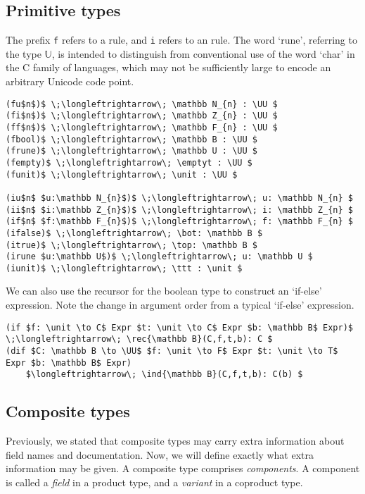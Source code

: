 \documentclass[11pt]{book}
\begin{document}
\subsection{Primitive types}
The prefix \lstinline{f} refers to a \rform{} rule, and \lstinline{i} refers to an \rintro{} rule.
The word `rune', referring to the type \( \mathbb U \), is intended to distinguish from conventional use of the word `char' in the C family of languages, which may not be sufficiently large to encode an arbitrary Unicode code point.
\begin{lstlisting}[mathescape=true]
(fu$n$)$ \;\longleftrightarrow\; \mathbb N_{n} : \UU $
(fi$n$)$ \;\longleftrightarrow\; \mathbb Z_{n} : \UU $
(ff$n$)$ \;\longleftrightarrow\; \mathbb F_{n} : \UU $
(fbool)$ \;\longleftrightarrow\; \mathbb B : \UU $
(frune)$ \;\longleftrightarrow\; \mathbb U : \UU $
(fempty)$ \;\longleftrightarrow\; \emptyt : \UU $
(funit)$ \;\longleftrightarrow\; \unit : \UU $

(iu$n$ $u:\mathbb N_{n}$)$ \;\longleftrightarrow\; u: \mathbb N_{n} $
(ii$n$ $i:\mathbb Z_{n}$)$ \;\longleftrightarrow\; i: \mathbb Z_{n} $
(if$n$ $f:\mathbb F_{n}$)$ \;\longleftrightarrow\; f: \mathbb F_{n} $
(ifalse)$ \;\longleftrightarrow\; \bot: \mathbb B $
(itrue)$ \;\longleftrightarrow\; \top: \mathbb B $
(irune $u:\mathbb U$)$ \;\longleftrightarrow\; u: \mathbb U $
(iunit)$ \;\longleftrightarrow\; \ttt : \unit $
\end{lstlisting}
We can also use the recursor for the boolean type to construct an `if-else' expression.
Note the change in argument order from a typical `if-else' expression.
\begin{lstlisting}[mathescape=true]
(if $f: \unit \to C$ Expr $t: \unit \to C$ Expr $b: \mathbb B$ Expr)$ \;\longleftrightarrow\; \rec{\mathbb B}(C,f,t,b): C $
(dif $C: \mathbb B \to \UU$ $f: \unit \to F$ Expr $t: \unit \to T$ Expr $b: \mathbb B$ Expr)
    $\longleftrightarrow\; \ind{\mathbb B}(C,f,t,b): C(b) $
\end{lstlisting}

\subsection{Composite types}
Previously, we stated that composite types may carry extra information about field names and documentation.
Now, we will define exactly what extra information may be given.
A composite type comprises \textit{components}.
A component is called a \textit{field} in a product type, and a \textit{variant} in a coproduct type.
\end{document}
